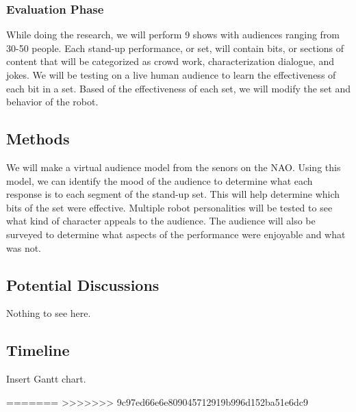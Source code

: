 \documentclass[onecolumn, draftclsnofoot,10pt, compsoc]{IEEEtran}
\begin{document}
\subsubsection{Evaluation Phase}
While doing the research, we will perform 9 shows with audiences ranging from 30-50 people. Each stand-up performance, or set, will contain bits, or sections of content that will be categorized as crowd work, characterization dialogue, and jokes. We will be testing on a live human audience to learn the effectiveness of each bit in a set. Based of the effectiveness of each set, we will modify the set and behavior of the robot.

\subsection{Methods}
We will make a virtual audience model from the senors on the NAO. Using this model, we can identify the mood of the audience to determine what each response is to each segment of the stand-up set. This will help determine which bits of the set were effective. Multiple robot personalities will be tested to see what kind of character appeals to the audience. The audience will also be surveyed to determine what aspects of the performance were enjoyable and what was not.


\subsection{Potential Discussions}

Nothing to see here.

\subsection{Timeline}

Insert Gantt chart.


=======
>>>>>>> 9c97ed66e6e809045712919b996d152ba51e6dc9


\end{document}
